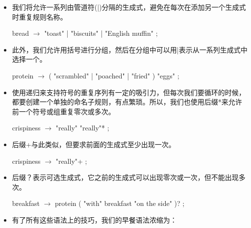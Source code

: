 \documentclass[cn,11pt,chinese]{elegantbook}
\begin{document}
\begin{itemize}
  \item 我们将允许一系列由管道符(|)分隔的生成式，避免在每次在添加另一个生成式时重复规则名称。

  \begin{tcolorbox}
  bread $\rightarrow$ "toast" | "biscuits" | "English muffin" ;
  \end{tcolorbox}

  \item 此外，我们允许用括号进行分组，然后在分组中可以用|表示从一系列生成式中选择一个。

  \begin{tcolorbox}
  protein $\rightarrow$ ( "scrambled" | "poached" | "fried" ) "eggs" ;
  \end{tcolorbox}

  \item 使用递归来支持符号的重复序列有一定的吸引力，但每次我们要循环的时候，都要创建一个单独的命名子规则，有点繁琐。所以，我们也使用后缀*来允许前一个符号或组重复零次或多次。

  \begin{tcolorbox}
  crispiness $\rightarrow$ "really" "really"* ;
  \end{tcolorbox}

  \item 后缀+与此类似，但要求前面的生成式至少出现一次。

  \begin{tcolorbox}
  crispiness $\rightarrow$ "really"+ ;
  \end{tcolorbox}

  \item 后缀？表示可选生成式，它之前的生成式可以出现零次或一次，但不能出现多次。

  \begin{tcolorbox}
  breakfast $\rightarrow$ protein ( "with" breakfast "on the side" )? ;
  \end{tcolorbox}

  \item 有了所有这些语法上的技巧，我们的早餐语法浓缩为：


\end{itemize}
\end{document}
